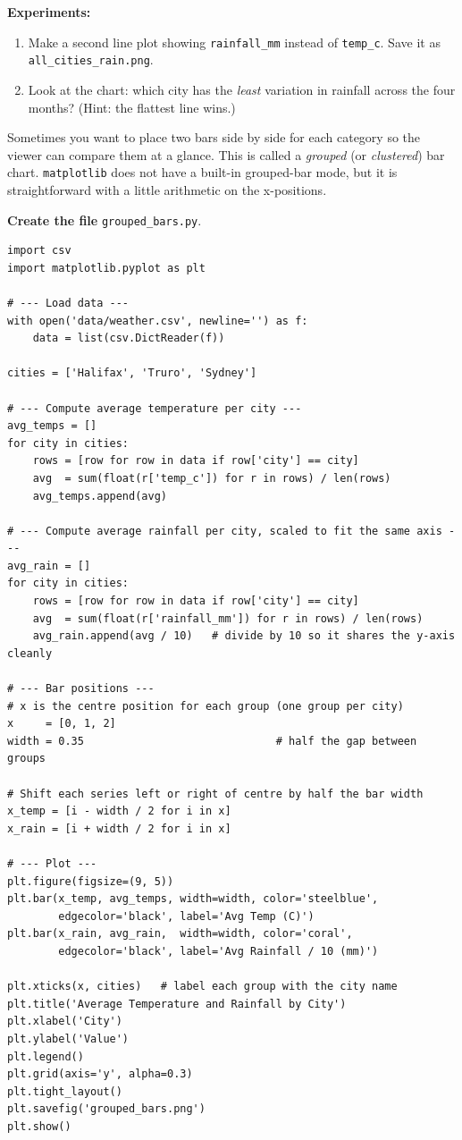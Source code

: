 \documentclass{cslab}
\begin{document}
\textbf{Experiments:}
\begin{enumerate}
    \item Make a second line plot showing \texttt{rainfall\_mm} instead of \texttt{temp\_c}. Save it as \texttt{all\_cities\_rain.png}.
    \item Look at the chart: which city has the \emph{least} variation in rainfall across the four months? (Hint: the flattest line wins.)
\end{enumerate}


Sometimes you want to place two bars side by side for each category so the viewer can compare them at a glance. This is called a \emph{grouped} (or \emph{clustered}) bar chart. \texttt{matplotlib} does not have a built-in grouped-bar mode, but it is straightforward with a little arithmetic on the x-positions.

\textbf{Create the file} \texttt{grouped\_bars.py}.

\begin{lstlisting}
import csv
import matplotlib.pyplot as plt

# --- Load data ---
with open('data/weather.csv', newline='') as f:
    data = list(csv.DictReader(f))

cities = ['Halifax', 'Truro', 'Sydney']

# --- Compute average temperature per city ---
avg_temps = []
for city in cities:
    rows = [row for row in data if row['city'] == city]
    avg  = sum(float(r['temp_c']) for r in rows) / len(rows)
    avg_temps.append(avg)

# --- Compute average rainfall per city, scaled to fit the same axis ---
avg_rain = []
for city in cities:
    rows = [row for row in data if row['city'] == city]
    avg  = sum(float(r['rainfall_mm']) for r in rows) / len(rows)
    avg_rain.append(avg / 10)   # divide by 10 so it shares the y-axis cleanly

# --- Bar positions ---
# x is the centre position for each group (one group per city)
x     = [0, 1, 2]
width = 0.35                              # half the gap between groups

# Shift each series left or right of centre by half the bar width
x_temp = [i - width / 2 for i in x]
x_rain = [i + width / 2 for i in x]

# --- Plot ---
plt.figure(figsize=(9, 5))
plt.bar(x_temp, avg_temps, width=width, color='steelblue',
        edgecolor='black', label='Avg Temp (C)')
plt.bar(x_rain, avg_rain,  width=width, color='coral',
        edgecolor='black', label='Avg Rainfall / 10 (mm)')

plt.xticks(x, cities)   # label each group with the city name
plt.title('Average Temperature and Rainfall by City')
plt.xlabel('City')
plt.ylabel('Value')
plt.legend()
plt.grid(axis='y', alpha=0.3)
plt.tight_layout()
plt.savefig('grouped_bars.png')
plt.show()
\end{lstlisting}
\end{document}
